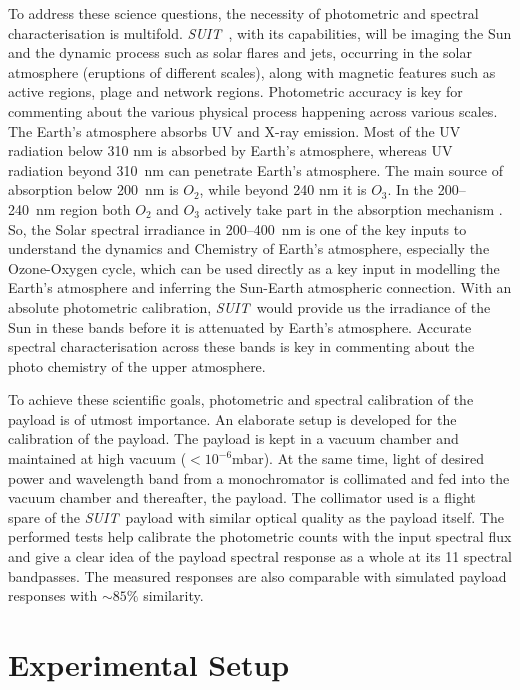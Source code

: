 \documentclass[12pt]{spieman}  %
\newcommand{\suit}{{\it SUIT~}}
\begin{document}
To address these science questions, the necessity of photometric and spectral characterisation is multifold.  \suit, with its capabilities, will be imaging the Sun and the dynamic process such as solar flares and jets, occurring in the solar atmosphere (eruptions of different scales), along with magnetic features such as active regions, plage and network regions. Photometric accuracy is key for commenting about the various physical process happening across various scales. The Earth's atmosphere absorbs UV and X-ray emission. Most of the UV radiation below 310 nm is absorbed by Earth's atmosphere, whereas UV radiation beyond 310~nm can penetrate Earth's atmosphere. The main source of absorption below 200~nm is $O_{2}$, while beyond 240 nm it is $O_{3}$. In the 200{--}240~nm region both $O_{2}$ and $O_{3}$ actively take part in the absorption mechanism \cite{haigh07}.
So, the Solar spectral irradiance in 200{--}400~nm is one of the key inputs to understand the dynamics and Chemistry of Earth's atmosphere, especially the Ozone-Oxygen cycle, which can be used directly as a key input in modelling the Earth's atmosphere and inferring the Sun-Earth atmospheric connection. With an absolute photometric calibration, \suit would provide us the irradiance of the Sun in these bands before it is attenuated by Earth's atmosphere. Accurate spectral characterisation across these bands is key in commenting about the photo chemistry of the upper atmosphere.

To achieve these scientific goals, photometric and spectral calibration of the payload is of utmost importance. An elaborate setup is developed for the calibration of the payload. The payload is kept in a vacuum chamber and maintained at high vacuum ($<10^{-6}$mbar). At the same time, light of desired power and wavelength band from a monochromator is collimated and fed into the vacuum chamber and thereafter, the payload. The collimator used is a flight spare of the \suit payload with similar optical quality as the payload itself. The performed tests help calibrate the photometric counts with the input spectral flux and give a clear idea of the payload spectral response as a whole at its 11 spectral bandpasses. The measured responses are also comparable with simulated payload responses with $\sim 85\%$ similarity.

\section{Experimental Setup}\label{sec:setup}
\end{document}
